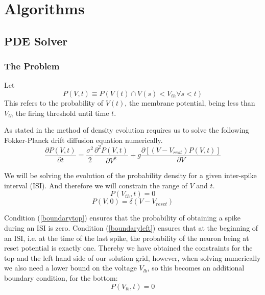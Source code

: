 \documentclass[10pt]{article}
\begin{document}
\section{Algorithms}

\subsection{PDE Solver}

\subsubsection{The Problem}
Let 
\begin{equation}
    P(V,t) \equiv P(V(t) \cap  V(s) < V_{th} \forall s < t)
\end{equation}
This refers to the probability of $V(t)$, the membrane potential,
being less than $V_{th}$ the firing threshold until time $t$.  

As stated in \cite{PaninskiPillowSimoncelli} the method of density
evolution requires us to solve the
following Fokker-Planck drift diffusion equation numerically.
\begin{equation}
    \frac{\partial P(V,t)}{\partial t} =
    \frac{\sigma^2}{2} \frac{\partial^2 P(V,t) } {\partial V^2} +
    g\frac{\partial[(V-V_{rest})P(V,t)]}{\partial V}
    \label{fokkerplanck}
\end{equation}

We will be solving the evolution of the probability density for a
given inter-spike interval (ISI). And therefore we will constrain the range
of $V$ and $t$.
\begin{equation}
    P(V_{th},t) = 0
    \label{boundarytop}
\end{equation}
\begin{equation}
    P(V,0) = \delta(V-V_{reset})
    \label{boundaryleft}
\end{equation}

Condition (\ref{boundarytop}) ensures that the probability of obtaining a spike
during an ISI is zero. Condition (\ref{boundaryleft}) ensures
that at the beginning of an ISI, i.e. at the time of the last spike,
the probability of the neuron being at reset potential is exactly one.
Thereby we have obtained the constraints for the top and the left hand
side of our solution grid, however, when solving numerically we also
need a lower bound on the voltage $V_{lb}$, so this becomes an
additional boundary condition, for the  bottom:
\begin{equation}
    P(V_{lb},t) = 0 
    \label{boundarybottom}
\end{equation}
\end{document}
